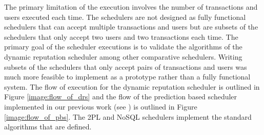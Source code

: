 The primary limitation of the execution involves the number of transactions and users executed each time. The schedulers are not designed as fully functional schedulers that can accept multiple transactions and users but are subsets of the schedulers that only accept two users and two transactions each time. The primary goal of the scheduler executions is to validate the algorithms of the dynamic reputation scheduler among other comparative schedulers. Writing subsets of the schedulers that only accept pairs of transactions and users was much more feasible to implement as a prototype rather than a fully functional system. The flow of execution for the dynamic reputation scheduler is outlined in Figure \ref{image:flow_of_drs} and the flow of the prediction based scheduler implemented in our previous work (see \cite{ravan_ensuring_2020}) is outlined in Figure \ref{image:flow_of_pbs}. The \ac{2PL} and NoSQL schedulers implement the standard algorithms that are defined.

